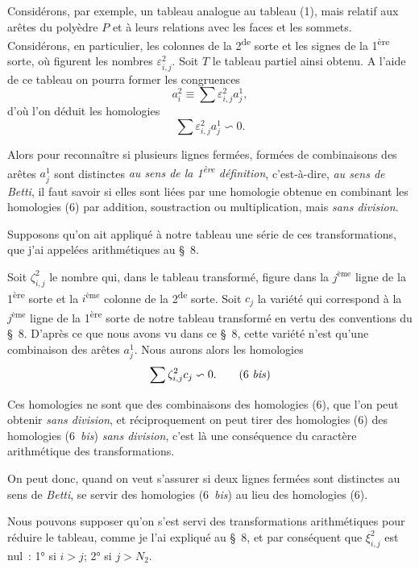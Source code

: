 \documentclass{article}
\begin{document}
Considérons, par exemple, un tableau analogue au tableau (1), mais relatif aux arêtes du polyèdre $P$ et à leurs relations avec les faces et les sommets. Considérons, en particulier, les colonnes de la 2\textsuperscript{de} sorte et les signes de la 1\textsuperscript{ère} sorte, où figurent les nombres $\varepsilon^{2}_{i,j}$. Soit $T$ le tableau partiel ainsi obtenu. A l'aide de ce tableau on pourra former les congruences
\[ a^{2}_{i} \equiv \sum \varepsilon^{2}_{i,j} a^{1}_{j}, \]
d'où l'on déduit les homologies
\[ \sum \varepsilon^{2}_{i,j} a^{1}_{j} \backsim 0. \tag{6} \]

Alors pour reconnaître si plusieurs lignes fermées, formées de
combinaisons des arêtes $a^{1}_{j}$ sont distinctes \emph{au sens de la 1\textsuperscript{ère} définition}, c'est-à-dire, \emph{au sens de Betti}, il faut savoir si elles sont liées par une homologie obtenue en combinant les homologies (6) par addition, soustraction ou multiplication, mais \emph{sans division}.

Supposons qu'on ait appliqué à notre tableau une série de ces transformations, que j'ai appelées arithmétiques au \S~8.

Soit $\zeta^{2}_{i,j}$ le nombre qui, dans le tableau transformé, figure dans la $j^{\text{ème}}$ ligne de la 1\textsuperscript{ère} sorte et la $i^{\text{ème}}$ colonne de la 2\textsuperscript{de} sorte. Soit $c_{j}$ la variété qui correspond à la $j^{\text{ème}}$ ligne de la 1\textsuperscript{ère} sorte de notre tableau transformé en vertu des conventions du \S~8. D'après ce que nous avons vu dans ce \S~8, cette variété n'est qu'une combinaison des arêtes $a^{1}_{j}$. Nous aurons alors les homologies
\[ \sum \zeta^{2}_{i,j} c_{j} \backsim 0. \tag{6 \textit{bis}} \]

Ces homologies ne sont que des combinaisons des homologies (6), que l'on peut obtenir \emph{sans division}, et réciproquement on peut tirer des homologies (6) des homologies (6~\emph{bis}) \emph{sans division}, c'est là une conséquence du caractère arithmétique des transformations.

On peut donc, quand on veut s'assurer si deux lignes fermées sont distinctes au sens de \emph{Betti}, se servir des homologies (6~\emph{bis}) au lieu des homologies (6).

Nous pouvons supposer qu'on s'est servi des transformations arithmétiques pour réduire le tableau, comme je l'ai expliqué au \S~8, et par conséquent que $\xi^{2}_{i,j}$ est nul~: 1° si $i > j$; 2° si $j > N_{2}$.
\end{document}
